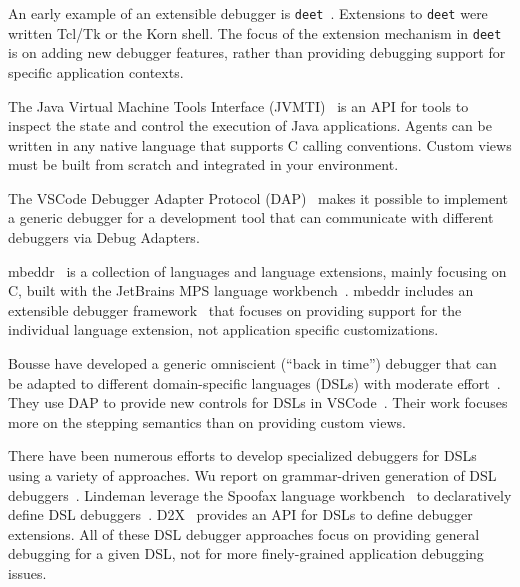 \documentclass[sigplan,anonymous,review,10pt]{acmart}
\newcommand\deet{{\tt deet}\xspace}
\begin{document}
An early example of an extensible debugger is \deet~\cite{Hans97a}.
Extensions to \deet were written Tcl/Tk or the Korn shell.
The focus of the extension mechanism in \deet is on adding new debugger features, rather than providing debugging support for specific application contexts.

The Java Virtual Machine Tools Interface (JVMTI)~\cite{JVMTI24} is an API for tools to inspect the state and control the execution of Java applications.
Agents can be written in any native language that supports C calling conventions.
Custom views must be built from scratch and integrated in your environment.

The VSCode Debugger Adapter Protocol (DAP)~\cite{DAP21} makes it possible to implement a generic debugger for a development tool that can communicate with different debuggers via Debug Adapters.

mbeddr~\cite{Voel17a} is a collection of languages and language extensions, mainly focusing on C, built with the JetBrains MPS language workbench~\cite{Camp14a}.
mbeddr includes an extensible debugger framework~\cite{Pavl15a} that focuses on providing support for the individual language extension, not application specific customizations.

Bousse \etal have developed a generic omniscient (``back in time'') debugger that can be adapted to different domain-specific languages (DSLs) with moderate effort~\cite{Bous18a}.
They use DAP to provide new controls for DSLs in VSCode~\cite{Enet23a}.
Their work focuses more on the stepping semantics than on providing custom views.

There have been numerous efforts to develop specialized debuggers for DSLs using a variety of approaches.
Wu \etal report on grammar-driven generation of DSL debuggers~\cite{HuiW08a}.
Lindeman \etal leverage the Spoofax language workbench~\cite{Kats10a} to declaratively define DSL debuggers~\cite{Lind11a}.
D2X~\cite{Brah23a} provides an API for DSLs to define debugger extensions.
All of these DSL debugger approaches focus on providing general debugging for a given DSL, not for more finely-grained application debugging issues.
\end{document}
